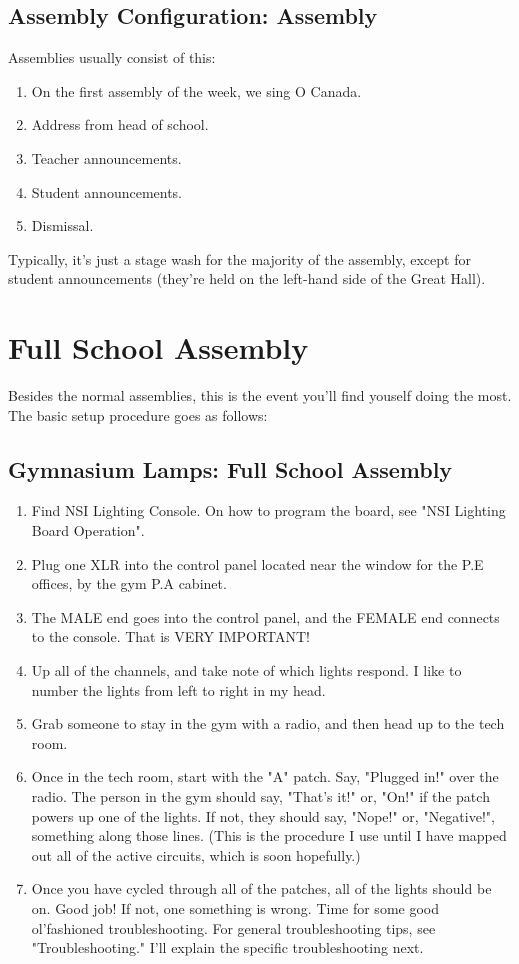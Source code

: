 \documentclass[11pt,a4paper]{book}
\begin{document}
\section{Assembly Configuration: Assembly}
Assemblies usually consist of this:
\begin{enumerate}
\item On the first assembly of the week, we sing O Canada.
\item Address from head of school.
\item Teacher announcements.
\item Student announcements. 
\item Dismissal.
\end{enumerate} 
Typically, it's just a stage wash for the majority of the assembly, except for student announcements (they're held on the left-hand side of the Great Hall).

\chapter{Full School Assembly}
Besides the normal assemblies, this is the event you'll find youself doing the most. The basic setup procedure goes as follows:
\section{Gymnasium Lamps: Full School Assembly}
\begin{enumerate}
\item Find NSI Lighting Console. On how to program the board, see "NSI Lighting Board Operation".
\item Plug one XLR into the control panel located near the window for the P.E offices, by the gym P.A cabinet.
\item The MALE end goes into the control panel, and the FEMALE end connects to the console. That is VERY IMPORTANT!
\item Up all of the channels, and take note of which lights respond. I like to number the lights from left to right in my head.
\item Grab someone to stay in the gym with a radio, and then head up to the tech room.
\item Once in the tech room, start with the "A" patch. Say, "Plugged in!" over the radio. The person in the gym should say, "That's it!" or, "On!" if the patch powers up one of the lights. If not, they should say, "Nope!" or, "Negative!", something along those lines. (This is the procedure I use until I have mapped out all of the active circuits, which is soon hopefully.)
\item Once you have cycled through all of the patches, all of the lights should be on. Good job! If not, one something is wrong. Time for some good ol'fashioned troubleshooting. For general troubleshooting tips, see "Troubleshooting." I'll explain the specific troubleshooting next.
\end{enumerate}
\end{document}
